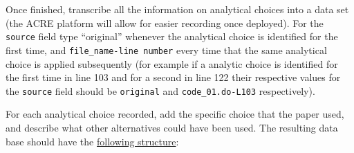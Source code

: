 \documentclass[]{book}
\begin{document}
Once finished, transcribe all the information on analytical choices into a data set (the ACRE platform will allow for easier recording once deployed). For the \texttt{source} field type ``original'' whenever the analytical choice is identified for the first time, and \texttt{file\_name-line\ number} every time that the same analytical choice is applied subsequently (for example if a analytic choice is identified for the first time in line 103 and for a second in line 122 their respective values for the \texttt{source} field should be \texttt{original} and \texttt{code\_01.do-L103} respectively).

For each analytical choice recorded, add the specific choice that the paper used, and describe what other alternatives could have been used. The resulting data base should have the \href{https://docs.google.com/spreadsheets/d/1nZuJSHswbZgaaIfBcyIUGPwG-WIP8zE1Oambud-WoDc/edit?usp=sharing}{following structure}:
\end{document}
